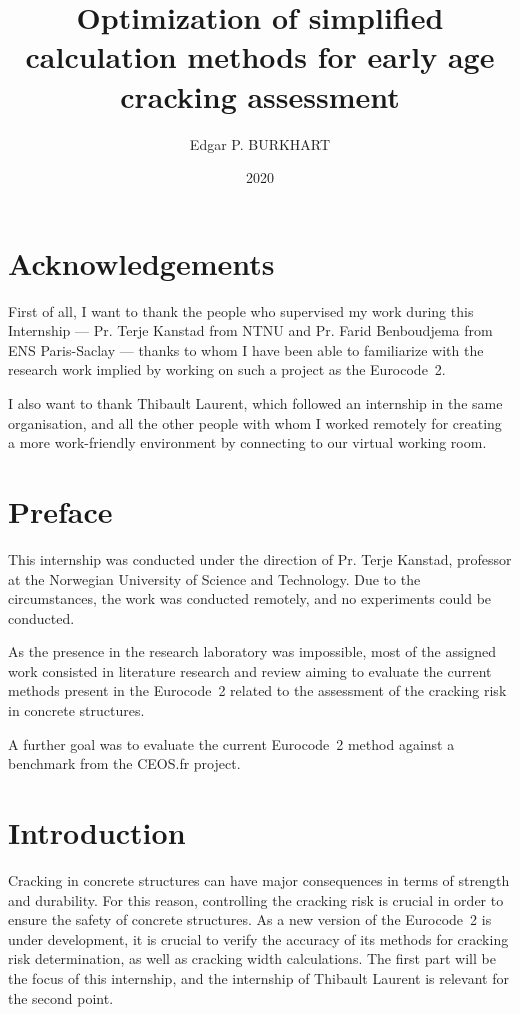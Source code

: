\documentclass[a4paper,11pt]{memoir}
\title{Optimization of simplified calculation methods for early age cracking assessment}
\author{Edgar P. BURKHART}
\date{2020}
\begin{document}
\begin{titlingpage}
  \maketitle
\end{titlingpage}

\frontmatter
\tableofcontents
\listoffigures
\listoftables

\chapter{Acknowledgements}
First of all, I want to thank the people who supervised my work during this
Internship --- Pr. Terje Kanstad from NTNU and Pr. Farid Benboudjema from ENS
Paris-Saclay --- thanks to whom I have been able to familiarize with the
research work implied by working on such a project as the Eurocode~2.

I also want to thank Thibault Laurent, which followed an internship in the same
organisation, and all the other people with whom I worked remotely for creating a more
work-friendly environment by connecting to our virtual working room.

\chapter{Preface}
This internship was conducted under the direction of Pr. Terje Kanstad,
professor at the Norwegian University of Science and Technology. Due to the
circumstances, the work was conducted remotely, and no experiments could be
conducted.

As the presence in the research laboratory was impossible, most of the assigned
work consisted in literature research and review aiming to evaluate the current
methods present in the Eurocode~2 related to the assessment of the cracking
risk in concrete structures.

A further goal was to evaluate the current Eurocode~2 method against a
benchmark from the CEOS.fr project.

\mainmatter
\chapter{Introduction}
Cracking in concrete structures can have major consequences in terms of
strength and durability. For this reason, controlling the cracking risk is
crucial in order to ensure the safety of concrete structures. As a new version
of the Eurocode~2 \cite{EC2} is under development, it is crucial to verify the accuracy
of its methods for cracking risk determination, as well as cracking width
calculations. The first part will be the focus of this internship, and the
internship of Thibault Laurent is relevant for the second point.
\end{document}
